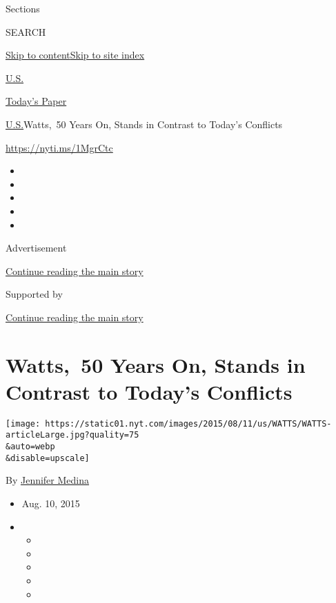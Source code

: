 Sections

SEARCH

\protect\hyperlink{site-content}{Skip to
content}\protect\hyperlink{site-index}{Skip to site index}

\href{https://www.nytimes.com/section/us}{U.S.}

\href{https://myaccount.nytimes.com/auth/login?response_type=cookie\&client_id=vi}{}

\href{https://www.nytimes.com/section/todayspaper}{Today's Paper}

\href{/section/us}{U.S.}\textbar{}Watts,~50 Years On, Stands in Contrast
to Today's Conflicts

\href{https://nyti.ms/1MgrCtc}{https://nyti.ms/1MgrCtc}

\begin{itemize}
\item
\item
\item
\item
\item
\end{itemize}

Advertisement

\protect\hyperlink{after-top}{Continue reading the main story}

Supported by

\protect\hyperlink{after-sponsor}{Continue reading the main story}

\hypertarget{watts-50-years-on-stands-in-contrast-to-todays-conflicts}{%
\section{Watts,~50 Years On, Stands in Contrast to Today's
Conflicts}\label{watts-50-years-on-stands-in-contrast-to-todays-conflicts}}

\texttt{[image: https://static01.nyt.com/images/2015/08/11/us/WATTS/WATTS-articleLarge.jpg?quality=75\\\&auto=webp\\\&disable=upscale]}

By \href{http://www.nytimes.com/by/jennifer-medina}{Jennifer Medina}

\begin{itemize}
\item
  Aug. 10, 2015
\item
  \begin{itemize}
  \item
  \item
  \item
  \item
  \item
  \end{itemize}
\end{itemize}

